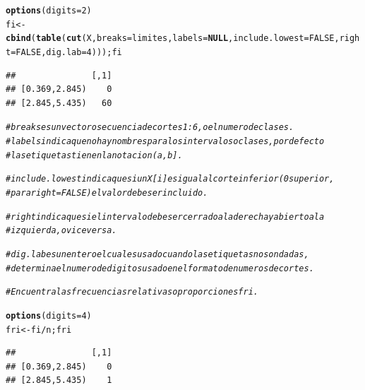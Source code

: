 \documentclass[12pt,letterpaper]{article}\usepackage[]{graphicx}\usepackage[]{color}
\makeatletter
\newcommand{\hlnum}[1]{\textcolor[rgb]{0.686,0.059,0.569}{#1}}%
\newcommand{\hlcom}[1]{\textcolor[rgb]{0.678,0.584,0.686}{\textit{#1}}}%
\newcommand{\hlopt}[1]{\textcolor[rgb]{0,0,0}{#1}}%
\newcommand{\hlstd}[1]{\textcolor[rgb]{0.345,0.345,0.345}{#1}}%
\newcommand{\hlkwa}[1]{\textcolor[rgb]{0.161,0.373,0.58}{\textbf{#1}}}%
\newcommand{\hlkwb}[1]{\textcolor[rgb]{0.69,0.353,0.396}{#1}}%
\newcommand{\hlkwc}[1]{\textcolor[rgb]{0.333,0.667,0.333}{#1}}%
\newcommand{\hlkwd}[1]{\textcolor[rgb]{0.737,0.353,0.396}{\textbf{#1}}}%
\newenvironment{kframe}{%
 \def\at@end@of@kframe{}%
 \ifinner\ifhmode%
  \def\at@end@of@kframe{\end{minipage}}%
  \begin{minipage}{\columnwidth}%
 \fi\fi%
 \def\FrameCommand##1{\hskip\@totalleftmargin \hskip-\fboxsep
 \colorbox{shadecolor}{##1}\hskip-\fboxsep
     \hskip-\linewidth \hskip-\@totalleftmargin \hskip\columnwidth}%
 \MakeFramed {\advance\hsize-\width
   \@totalleftmargin\z@ \linewidth\hsize
   \@setminipage}}%
 {\par\unskip\endMakeFramed%
 \at@end@of@kframe}
\newenvironment{knitrout}{}{} %
\makeatother
\begin{document}
\begin{enumerate}
\begin{knitrout}
\begin{kframe}
\begin{alltt}
\hlkwd{options}\hlstd{(}\hlkwc{digits}\hlstd{=}\hlnum{2}\hlstd{)}
\hlstd{fi} \hlkwb{<-} \hlkwd{cbind}\hlstd{(}\hlkwd{table}\hlstd{(}\hlkwd{cut}\hlstd{(X,} \hlkwc{breaks} \hlstd{= limites,} \hlkwc{labels}\hlstd{=}\hlkwa{NULL}\hlstd{,} \hlkwc{include.lowest}\hlstd{=}\hlnum{FALSE}\hlstd{,} \hlkwc{right}\hlstd{=}\hlnum{FALSE}\hlstd{,} \hlkwc{dig.lab}\hlstd{=}\hlnum{4}\hlstd{))); fi}
\end{alltt}
\begin{verbatim}
##               [,1]
## [0.369,2.845)    0
## [2.845,5.435)   60
\end{verbatim}
\end{kframe}
\end{knitrout}

\begin{knitrout}
\color{fgcolor}\begin{kframe}
\begin{alltt}
\hlcom{# breakses un vector o secuencia de cortes 1:6, o el numero de clases.}
\hlcom{# labelsindica que no hay nombres para los intervalos o clases, por defecto }
\hlcom{# las etiquetas tienen la notacion (a, b].}

\hlcom{# include.lowestindica que si un X[i] es igual al corte inferior (0 superior, }
\hlcom{# para right=FALSE) el valor debe ser incluido.}

\hlcom{# rightindica que si el intervalo debe ser cerradoa la derecha y abierto a la}
\hlcom{# izquierda, o viceversa. }

\hlcom{# dig.labes un entero el cual es usado cuando las etiquetas no son dadas,}
\hlcom{# determina el numero de digitos usado en el formato de numeros de cortes. }
\end{alltt}
\end{kframe}
\end{knitrout}

\begin{knitrout}
\color{fgcolor}\begin{kframe}
\begin{alltt}
\hlcom{# Encuentra las frecuencias relativas o proporciones fri.}

\hlkwd{options}\hlstd{(}\hlkwc{digits}\hlstd{=}\hlnum{4}\hlstd{)}
\hlstd{fri} \hlkwb{<-} \hlstd{fi}\hlopt{/}\hlstd{n; fri}
\end{alltt}
\begin{verbatim}
##               [,1]
## [0.369,2.845)    0
## [2.845,5.435)    1
\end{verbatim}
\end{kframe}
\end{knitrout}


\end{enumerate}
\end{document}
